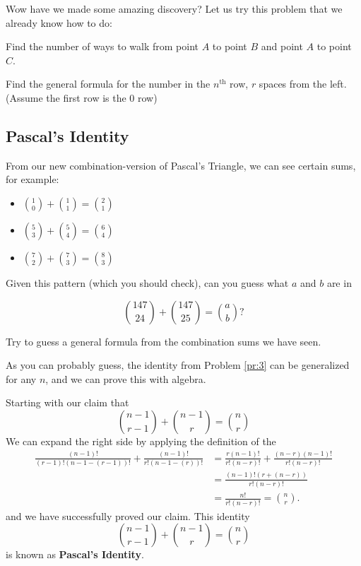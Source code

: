 Wow have we made some amazing discovery? Let us try this problem that we already know how to do:
\clearpage
\begin{problem}
Find the number of ways to walk from point $A$ to point $B$ and point $A$ to point $C$.
\begin{center}
\end{center}
\end{problem}

\begin{problem}
Find the general formula for the number in the $n^{\text{th}}$ row, $r$ spaces from the left. (Assume the first row is the 0 row)
\end{problem}

\subsection{Pascal's Identity}
From our new combination-version of Pascal's Triangle, we can see certain sums, for example:

\begin{itemize}
    \item $\binom{1}{0}+\binom{1}{1} = \binom{2}{1}$
    \item $\binom{5}{3}+\binom{5}{4} = \binom{6}{4}$
    \item $\binom{7}{2}+\binom{7}{3} = \binom{8}{3}$
\end{itemize}

Given this pattern (which you should check), can you guess what $a$ and $b$ are in 

$$\binom{147}{24}+\binom{147}{25} = \binom{a}{b}?$$

\begin{problem}
Try to guess a general formula from the combination sums we have seen.
\label{pr:3}
\end{problem}

As you can probably guess, the identity from Problem \ref{pr:3} can be generalized for any $n$, and we can prove this with algebra. 

Starting with our claim that
$$\binom{n-1}{r-1}+\binom{n-1}{r} = \binom{n}{r}$$
We can expand the right side by applying the definition of the \begin{align*}
\frac{(n-1)!}{(r-1)!(n-1-(r-1))!}+\frac{(n-1)!}{r!(n-1-(r))!} &= \frac{r(n-1)!}{r!(n-r)!}+\frac{(n-r)(n-1)!}{r!(n-r)!} \\
&= \frac{(n-1)!(r+(n-r))}{r!(n-r)!} \\
&= \frac{n!}{r!(n-r)!} = \binom{n}{r}.
\end{align*}
and we have successfully proved our claim. This identity 
$$\boxed{\binom{n-1}{r-1}+\binom{n-1}{r} = \binom{n}{r}}$$
is known as \textbf{Pascal's Identity}.


